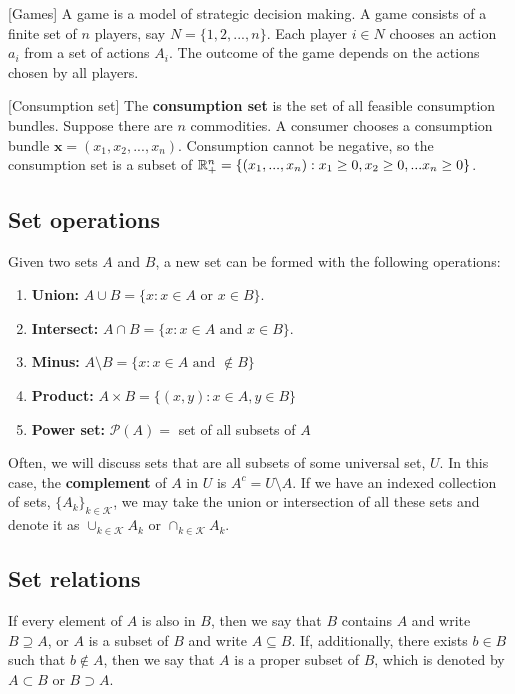 \begin{example}\label{ex:games}[Games]
  A game is a model of strategic decision making. A game consists of a
  finite set of $n$ players, say $N = \{1,2,..., n\}$. Each player $i
  \in N$ chooses an action $a_i$ from a set of actions $A_i$. The
  outcome of the game depends on the actions chosen by all players. 
\end{example}

\begin{example}\label{ex:conset}[Consumption set]
  The \textbf{consumption set} is the set of all feasible consumption
  bundles. Suppose there are $n$ commodities. A consumer chooses a
  consumption bundle $\mathbf{x} = (x_1, x_2, ..., x_n)$. Consumption
  cannot be negative, so the consumption set is a subset of $\mathbb{R}^n_+ =
  \{(x_1, ..., x_n) : x_1 \geq 0, x_2 \geq 0, ... x_n \geq 0 \}$.
\end{example}

\subsection{Set operations}

Given two sets $A$ and $B$, a new set can be formed with the following
operations:
\begin{enumerate}
\item \textbf{Union:} $A \cup B = \{x: x\in A \text{ or } x \in B\}$.
\item \textbf{Intersect:} $A \cap B = \{x: x \in A \text{ and } x \in
  B\}$. 
\item \textbf{Minus:} $A \setminus B = \{ x: x\in A \text{ and }
  \not\in B \}$
\item \textbf{Product:} $A \times B = \{(x,y): x \in A, y \in B \}$
\item \textbf{Power set:} $\mathcal{P}(A) =$ set of all subsets of $A$ 
\end{enumerate}
Often, we will discuss sets that are all subsets of some universal
set, $U$. In this case, the \textbf{complement} of $A$ in $U$ is $A^c
= U \setminus A$. If we have an indexed collection of sets, $\{A_k
\}_{k \in \mathcal{K}}$, we may take the union or intersection of all
these sets and denote it as $\cup_{k \in \mathcal{K}} A_k $ or
$\cap_{k \in \mathcal{K}} A_k$.

\subsection{Set relations}
If every element of $A$ is also in $B$, then we say that
$B$ contains $A$ and write $B \supseteq A$, or $A$ is a subset of $B$
and write $A \subseteq B$. If, additionally, there exists $b \in B$
such that $b \not\in A$, then we say that $A$ is a proper subset of $B$,
which is denoted by $A \subset B$ or $B \supset A$. 

